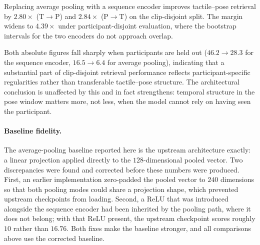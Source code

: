 Replacing average pooling with a sequence encoder improves tactile--pose
retrieval by $2.80\times$ (T$\rightarrow$P) and $2.84\times$
(P$\rightarrow$T) on the clip-disjoint split. The margin widens to
$4.39\times$ under participant-disjoint evaluation, where the bootstrap
intervals for the two encoders do not approach overlap.

Both absolute figures fall sharply when participants are held out
($46.2 \rightarrow 28.3$ for the sequence encoder, $16.5 \rightarrow 6.4$
for average pooling), indicating that a substantial part of clip-disjoint
retrieval performance reflects participant-specific regularities rather than
transferable tactile--pose structure. The architectural conclusion is
unaffected by this and in fact strengthens: temporal structure in the pose
window matters more, not less, when the model cannot rely on having seen the
participant.

\paragraph{Baseline fidelity.}
The average-pooling baseline reported here is the upstream architecture
exactly: a linear projection applied directly to the $128$-dimensional pooled
vector. Two discrepancies were found and corrected before these numbers were
produced. First, an earlier implementation zero-padded the pooled vector to
$240$ dimensions so that both pooling modes could share a projection shape,
which prevented upstream checkpoints from loading. Second, a ReLU that was
introduced alongside the sequence encoder had been inherited by the pooling
path, where it does not belong; with that ReLU present, the upstream
checkpoint scores roughly $10$ rather than $16.76$.
Both fixes make the baseline
stronger, and all comparisons above use the corrected baseline.


